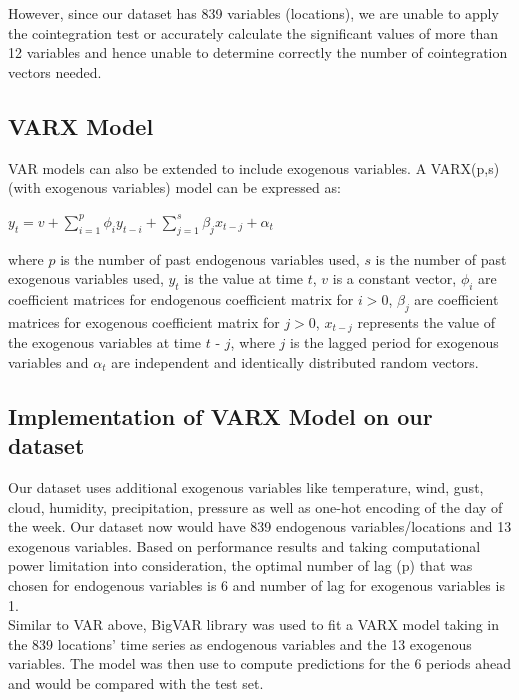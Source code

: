 \documentclass[nonblindrev,msom]{informs3} %
\begin{document}
\noindent However, since our dataset has 839 variables (locations), we are unable to apply the cointegration test or accurately calculate the significant values of more than 12 variables and hence unable to determine correctly the number of cointegration vectors needed. 

\subsection{VARX Model}
VAR models can also be extended to include exogenous variables. A VARX(p,s) (with exogenous variables) model can be expressed as: \\

\begin{center}
    $\displaystyle y_t=v+\sum_{i=1}^{p} \phi_{i}y_{t-i}+\sum_{j=1}^{s} \beta_{j}x_{t-j}+\alpha_t$
\end{center}

\noindent where $p$ is the number of past endogenous variables used, $s$ is the number of past exogenous variables used, $y_t$ is the value at time $t$, $v$ is a constant vector, $\phi_i$ are coefficient matrices for endogenous coefficient matrix for $i>0$, $\beta_j$ are coefficient matrices for exogenous coefficient matrix for $j>0$, $x_{t-j}$ represents the value of the exogenous variables at time $t$ - $j$, where $j$ is the lagged period for exogenous variables and $\alpha_t$ are independent and identically distributed random vectors. 

\subsection{Implementation of VARX Model on our dataset}
\noindent Our dataset uses additional exogenous variables like temperature, wind, gust, cloud, humidity, precipitation, pressure as well as one-hot encoding of the day of the week. Our dataset now would have 839 endogenous variables/locations and 13 exogenous variables. Based on performance results and taking computational power limitation into consideration, the optimal number of lag (p) that was chosen for endogenous variables is 6 and number of lag for exogenous variables is 1. \\

\noindent Similar to VAR above, BigVAR library was used to fit a VARX model taking in the 839 locations' time series as endogenous variables and the 13 exogenous variables. The model was then use to compute predictions for the 6 periods ahead and would be compared with the test set.
\end{document}
